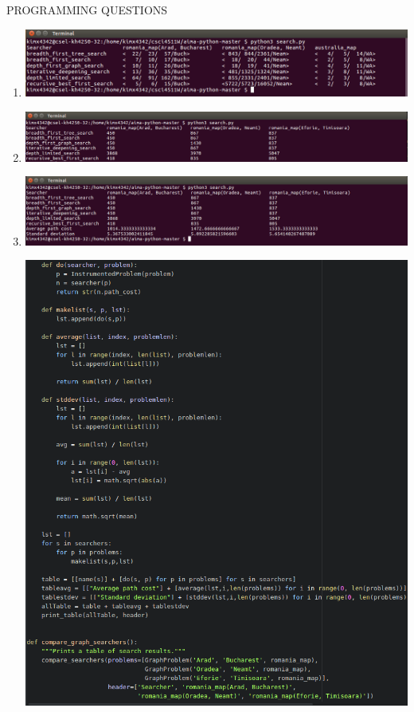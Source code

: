 \documentclass[12pt]{article}
\begin{document}
PROGRAMMING QUESTIONS
\begin{enumerate}
\item 
\includegraphics[width=\textwidth]{prob1.png} \par
\item
\includegraphics[width=\textwidth]{prob2.png} \par
\item
\includegraphics[width=\textwidth]{prob3.png} \par
\includegraphics[width=\textwidth]{code.png}
\end{enumerate}
\end{document}
